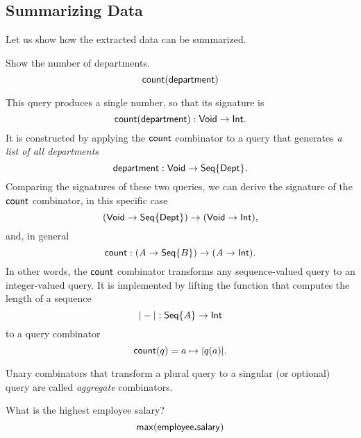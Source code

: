 

\subsection*{Summarizing Data}

Let us show how the extracted data can be summarized.

\begin{demo}
    \label{ex:count-department}
    Show the number of departments.
    \begin{equation*}
        \mathsf{count}(\mathsf{department})
    \end{equation*}
\end{demo}

This query produces a single number, so that its signature is
\begin{equation*}
    \mathsf{count}(\mathsf{department}) : \mathsf{Void} \to \mathsf{Int}.
\end{equation*}
It is constructed by applying the $\mathsf{count}$ combinator to a query that generates
\emph{a list of all departments}
\begin{equation*}
    \mathsf{department} : \mathsf{Void} \to \mathsf{Seq}{\left\{\mathsf{Dept}\right\}}.
\end{equation*}
Comparing the signatures of these two queries, we can derive the signature of
the $\mathsf{count}$ combinator, in this specific case
\begin{equation*}
    (\mathsf{Void} \to \mathsf{Seq}{\left\{\mathsf{Dept}\right\}}) \to (\mathsf{Void} \to \mathsf{Int}),
\end{equation*}
and, in general
\begin{equation*}
    \mathsf{count}: (A \to \mathsf{Seq}{\left\{B\right\}}) \to (A \to \mathsf{Int}).
\end{equation*}
In other words, the $\mathsf{count}$ combinator transforms any sequence-valued query
to an integer-valued query.  It is implemented by lifting the function that
computes the length of a sequence
\begin{equation*}
    |-| : \mathsf{Seq}{\left\{A\right\}} \to \mathsf{Int}
\end{equation*}
to a query combinator
\begin{equation*}
    \mathsf{count}(q) = a \mapsto |q(a)|.
\end{equation*}

Unary combinators that transform a plural query to a singular (or optional)
query are called \emph{aggregate} combinators.

\begin{demo}
    \label{ex:max-employee-salary}
    What is the highest employee salary?
    \begin{equation*}
        \mathsf{max}(\mathsf{employee}\boldsymbol{.}\mathsf{salary})
    \end{equation*}
\end{demo}

